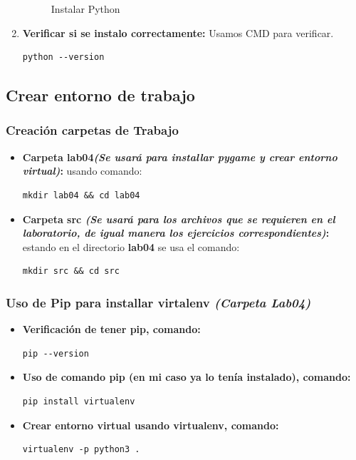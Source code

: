\documentclass{article}
\begin{document}
\begin{enumerate}
\begin{figure}[H]
      \caption{Instalar Python}
    \end{figure}
    \item \textbf{Verificar si se instalo correctamente:} Usamos CMD para verificar.
    \begin{lstlisting}[language={}]
      python --version
    \end{lstlisting}
  \end{enumerate}
  

  \subsection{Crear entorno de trabajo}
  
  
  \subsubsection{Creación carpetas de Trabajo}
  \begin{itemize}
    \item \textbf{Carpeta lab04\textit{(Se usará para installar pygame y crear entorno virtual)}: }usando comando:
    \begin{lstlisting}[language={}]
      mkdir lab04 && cd lab04
    \end{lstlisting}
    \item \textbf{Carpeta src \textit{(Se usará para los archivos que se requieren en el laboratorio, de igual manera los ejercicios correspondientes)}: }
    estando en el directorio \textbf{lab04} se usa el comando:
    \begin{lstlisting}[language={}]
      mkdir src && cd src
    \end{lstlisting}
  \end{itemize}
  

  \subsubsection{Uso de Pip para installar virtalenv \textit{(Carpeta Lab04)}}
  \begin{itemize}
    \item \textbf{Verificación de tener pip, comando:}
    \begin{lstlisting}[language={}]
      pip --version
    \end{lstlisting}
    \newpage
    \item \textbf{Uso de comando pip (en mi caso ya lo tenía instalado), comando:}
    \begin{lstlisting}[language={}]
      pip install virtualenv
    \end{lstlisting}
    \item \textbf{Crear entorno virtual usando virtualenv, comando: }
    \begin{lstlisting}[language={}]
      virtualenv -p python3 .
    \end{lstlisting}
  \end{itemize}
  
\end{document}
